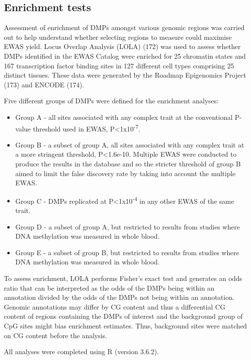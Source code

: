 \documentclass[11pt,twoside]{bristolthesis}
\providecommand{\tightlist}{%
  \setlength{\itemsep}{0pt}\setlength{\parskip}{0pt}}
\begin{document}
\hypertarget{enrichment-tests-04}{%
\subsection{Enrichment tests}\label{enrichment-tests-04}}

Assessment of enrichment of DMPs amongst various genomic regions was carried out to help understand whether selecting regions to measure could maximise EWAS yield. Locus Overlap Analysis (LOLA) (172) was used to assess whether DMPs identified in the EWAS Catalog were enriched for 25 chromatin states and 167 transcription factor binding sites in 127 different cell types comprising 25 distinct tissues. These data were generated by the Roadmap Epigenomics Project (173) and ENCODE (174).

Five different groups of DMPs were defined for the enrichment analyses:
\begin{itemize}
\tightlist
\item
  Group A - all sites associated with any complex trait at the conventional P-value threshold used in EWAS, P\textless1x10\textsuperscript{-7}.
\item
  Group B - a subset of group A, all sites associated with any complex trait at a more stringent threshold, P\textless1.6e-10. Multiple EWAS were conducted to produce the results in the database and so the stricter threshold of group B aimed to limit the false discovery rate by taking into account the multiple EWAS.
\item
  Group C - DMPs replicated at P\textless1x10\textsuperscript{-4} in any other EWAS of the same trait.
\item
  Group D - a subset of group A, but restricted to results from studies where DNA methylation was measured in whole blood.
\item
  Group E - a subset of group B, but restricted to results from studies where DNA methylation was measured in whole blood.
\end{itemize}
To assess enrichment, LOLA performs Fisher's exact test and generates an odds ratio that can be interpreted as the odds of the DMPs being within an annotation divided by the odds of the DMPs not being within an annotation. Genomic annotations may differ by CG content and thus a differential CG content of regions containing the DMPs of interest and the background group of CpG sites might bias enrichment estimates. Thus, background sites were matched on CG content before the analysis.

All analyses were completed using R (version 3.6.2).
\end{document}
